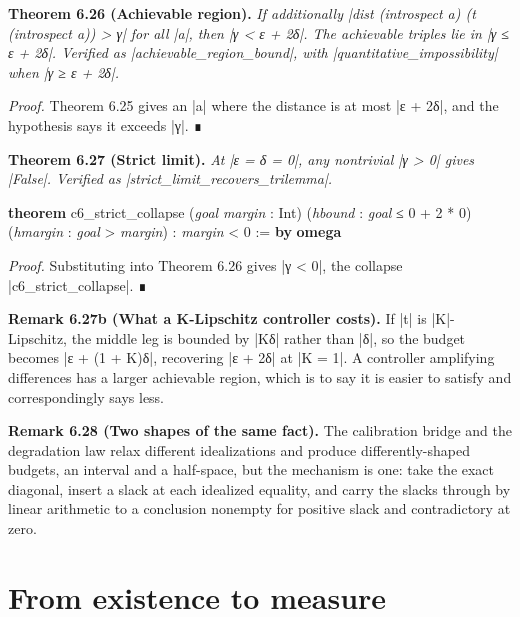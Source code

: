 \documentclass{memoir}
\begin{document}
\textbf{Theorem 6.26 (Achievable region).} \emph{If additionally
\LeanVerb|dist (introspect a) (t (introspect a)) > γ| for all \LeanVerb|a|, then \LeanVerb|γ < ε + 2δ|. The
achievable triples lie in \LeanVerb|γ ≤ ε + 2δ|. Verified as \LeanVerb|achievable_region_bound|,
with \LeanVerb|quantitative_impossibility| when \LeanVerb|γ ≥ ε + 2δ|.}

\emph{Proof.} Theorem 6.25 gives an \LeanVerb|a| where the distance is at most \LeanVerb|ε + 2δ|, and the
hypothesis says it exceeds \LeanVerb|γ|. ∎

\textbf{Theorem 6.27 (Strict limit).} \emph{At \LeanVerb|ε = δ = 0|, any nontrivial \LeanVerb|γ > 0| gives \LeanVerb|False|.
Verified as \LeanVerb|strict_limit_recovers_trilemma|.}

\begin{LeanVerbatim}
\textbf{theorem} c6_strict_collapse
    (\textit{goal} \textit{margin} : Int)
    (\textit{hbound} : \textit{goal} ≤ 0 + 2 * 0)
    (\textit{hmargin} : \textit{goal} > \textit{margin}) :
    \textit{margin} < 0 := \textbf{by} \textbf{omega}

\end{LeanVerbatim}


\emph{Proof.} Substituting into Theorem 6.26 gives \LeanVerb|γ < 0|, the collapse
\LeanVerb|c6_strict_collapse|. ∎

\textbf{Remark 6.27b (What a K-Lipschitz controller costs).} If \LeanVerb|t| is \LeanVerb|K|-Lipschitz, the
middle leg is bounded by \LeanVerb|Kδ| rather than \LeanVerb|δ|, so the budget becomes \LeanVerb|ε + (1 + K)δ|,
recovering \LeanVerb|ε + 2δ| at \LeanVerb|K = 1|. A controller amplifying differences has a larger
achievable region, which is to say it is easier to satisfy and correspondingly
says less.

\textbf{Remark 6.28 (Two shapes of the same fact).} The calibration bridge and the
degradation law relax different idealizations and produce differently-shaped
budgets, an interval and a half-space, but the mechanism is one: take the exact
diagonal, insert a slack at each idealized equality, and carry the slacks
through by linear arithmetic to a conclusion nonempty for positive slack and
contradictory at zero.



\section{From existence to measure}\label{Two--Schemas--of--Impossibility-005F-005F-005F--Machine--Checked--Limits--of--Trustworthy--Machine--Learning-005F-005F-005F--and--Why--They--Tighten--with--Capability----Approximate--Bridges--to--Real--Models----From--existence--to--measure}
\end{document}
